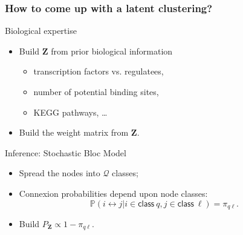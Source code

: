 
\begin{frame}
  \frametitle{How to come up with a latent clustering?}
  
  \begin{block}{Biological expertise}
    \begin{itemize}
    \item Build $\mathbf{Z}$ from prior biological information 
      \begin{itemize}
      \item transcription factors vs. regulatees,
      \item number of potential binding sites,
      \item KEGG pathways, \dots
      \end{itemize}
    \item Build the weight matrix from $\mathbf{Z}$.
    \end{itemize}
  \end{block}
  
  \vfill
  
  \begin{block}{Inference: Stochastic Bloc Model} 
    \begin{itemize}
    \item Spread the  nodes into $\mathcal{Q}$ classes;
    \item Connexion probabilities depend upon node classes:
      \begin{equation*}
        \mathbb{P} (i \leftrightarrow j|i \in \mathsf{ class}\ q, j \in
        \mathsf{ class }\ \ell) = \pi_{q \ell}.
      \end{equation*}
    \item Build $P_{\mathbf{Z}} \propto 1-\pi_{q\ell}$.
    \end{itemize}
   \end{block}
\end{frame}


